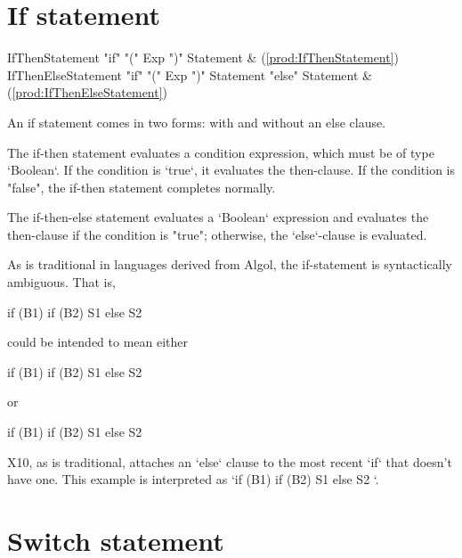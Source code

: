 \section{If statement}

\begin{bbgrammar}
     IfThenStatement \: \xcd"if" \xcd"(" Exp \xcd")" Statement & (\ref{prod:IfThenStatement}) \\
 IfThenElseStatement \: \xcd"if" \xcd"(" Exp \xcd")" Statement  \xcd"else" Statement  & (\ref{prod:IfThenElseStatement}) \\
\end{bbgrammar}

An if statement comes in two forms: with and without an else
clause.

The if-then statement evaluates a condition expression, which must be of type
\xcd`Boolean`. If the condition is \xcd`true`, it evaluates the then-clause.
If the condition is \xcd"false", the if-then statement completes normally.

The if-then-else statement evaluates a \xcd`Boolean` expression and 
evaluates the then-clause if the condition is
\xcd"true"; otherwise, the \xcd`else`-clause is evaluated.

As is traditional in languages derived from Algol, the if-statement is syntactically
ambiguous.  That is, 
\begin{xten}
if (B1) if (B2) S1 else S2
\end{xten}
could be intended to mean either 
\begin{xten}
if (B1) { if (B2) S1 else S2 }
\end{xten} 
or 
\begin{xten}
if (B1) {if (B2) S1} else S2
\end{xten}
X10, as is traditional, attaches an \xcd`else` clause to the most recent
\xcd`if` that doesn't have one.
This example is interpreted as 
\xcd`if (B1) { if (B2) S1 else S2 }`. 



\section{Switch statement}

